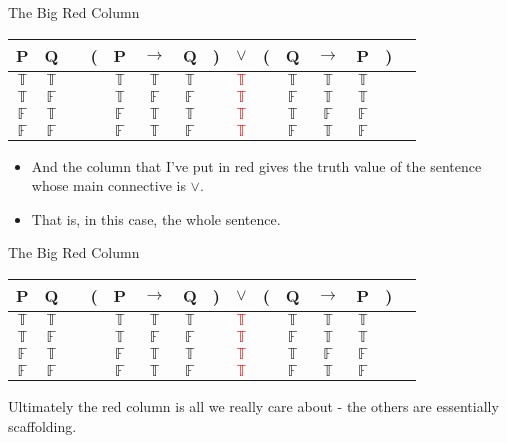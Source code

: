 \documentclass[
  ignorenonframetext,
]{beamer}
\providecommand{\tightlist}{%
  \setlength{\itemsep}{0pt}\setlength{\parskip}{0pt}}
\renewcommand{\,}{\text{, }}
\def\True{\mathbb{T}}
\def\False{\mathbb{F}}
\begin{document}
\begin{frame}{The Big Red Column}
\protect\hypertarget{the-big-red-column}{}
\begin{center}
\begin{tabular}{@{ }c@{ }@{ }c | c@{ }@{}c@{}@{ }c@{ }@{ }c@{ }@{ }c@{ }@{}c@{}@{ }c@{ }@{}c@{}@{ }c@{ }@{ }c@{ }@{ }c@{ }@{}c@{}@{ }c}
P & Q &  & ( & P & $\rightarrow$ & Q & ) & $\lor$ & ( & Q & $\rightarrow$ & P & ) & \\
\hline 
$\True$ & $\True$ &  &  & $\True$ & $\True$ & $\True$ &  & \textcolor{red}{$\True$} &  & $\True$ & $\True$ & $\True$ &  & \\
$\True$ & $\False$ &  &  & $\True$ & $\False$ & $\False$ &  & \textcolor{red}{$\True$} &  & $\False$ & $\True$ & $\True$ &  & \\
$\False$ & $\True$ &  &  & $\False$ & $\True$ & $\True$ &  & \textcolor{red}{$\True$} &  & $\True$ & $\False$ & $\False$ &  & \\
$\False$ & $\False$ &  &  & $\False$ & $\True$ & $\False$ &  & \textcolor{red}{$\True$} &  & $\False$ & $\True$ & $\False$ &  & \\
\end{tabular}

\end{center}

\begin{itemize}
\tightlist
\item
  And the column that I've put in red gives the truth value of the
  sentence whose main connective is \(\vee\).
\item
  That is, in this case, the whole sentence.
\end{itemize}
\end{frame}

\begin{frame}{The Big Red Column}
\protect\hypertarget{the-big-red-column-1}{}
\begin{center}
\begin{tabular}{@{ }c@{ }@{ }c | c@{ }@{}c@{}@{ }c@{ }@{ }c@{ }@{ }c@{ }@{}c@{}@{ }c@{ }@{}c@{}@{ }c@{ }@{ }c@{ }@{ }c@{ }@{}c@{}@{ }c}
P & Q &  & ( & P & $\rightarrow$ & Q & ) & $\lor$ & ( & Q & $\rightarrow$ & P & ) & \\
\hline 
$\True$ & $\True$ &  &  & $\True$ & $\True$ & $\True$ &  & \textcolor{red}{$\True$} &  & $\True$ & $\True$ & $\True$ &  & \\
$\True$ & $\False$ &  &  & $\True$ & $\False$ & $\False$ &  & \textcolor{red}{$\True$} &  & $\False$ & $\True$ & $\True$ &  & \\
$\False$ & $\True$ &  &  & $\False$ & $\True$ & $\True$ &  & \textcolor{red}{$\True$} &  & $\True$ & $\False$ & $\False$ &  & \\
$\False$ & $\False$ &  &  & $\False$ & $\True$ & $\False$ &  & \textcolor{red}{$\True$} &  & $\False$ & $\True$ & $\False$ &  & \\
\end{tabular}

\end{center}

Ultimately the red column is all we really care about - the others are
essentially scaffolding.
\end{frame}
\end{document}
